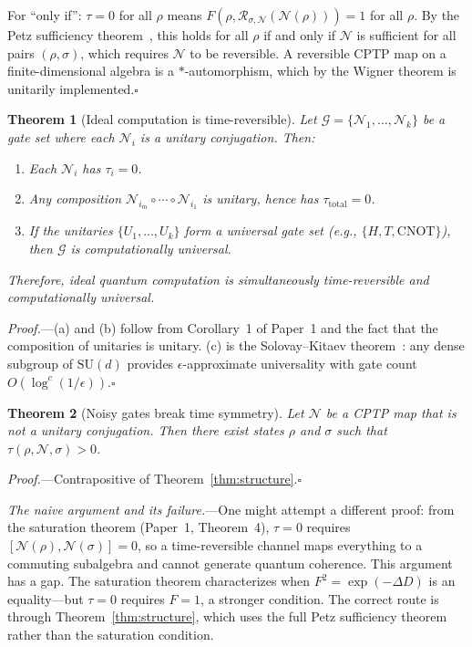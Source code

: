 \documentclass[prl,twocolumn,superscriptaddress,longbibliography,floatfix]{revtex4-2}
\newtheorem{theorem}{Theorem}
\newcommand{\Petz}{\mathcal{R}}
\newcommand{\chan}{\mathcal{N}}
\newcommand{\tauasym}{\tau}
\begin{document}
For ``only if'': $\tauasym = 0$ for all $\rho$ means
$F(\rho, \Petz_{\sigma,\chan}(\chan(\rho))) = 1$ for all $\rho$.  By
the Petz sufficiency theorem~\cite{Petz1988}, this holds for all
$\rho$ if and only if $\chan$ is sufficient for all pairs
$(\rho, \sigma)$, which requires $\chan$ to be reversible.  A
reversible CPTP map on a finite-dimensional algebra is a
$*$-automorphism, which by the Wigner theorem is unitarily
implemented.\hfill$\square$

\begin{theorem}[Ideal computation is time-reversible]
\label{thm:ideal}
Let\/ $\mathcal{G} = \{\chan_1, \ldots, \chan_k\}$ be a gate set
where each $\chan_i$ is a unitary conjugation.  Then:
\begin{enumerate}
\item[\emph{(a)}] Each $\chan_i$ has $\tauasym_i = 0$.
\item[\emph{(b)}] Any composition
  $\chan_{i_m} \circ \cdots \circ \chan_{i_1}$ is unitary, hence has
  $\tauasym_{\mathrm{total}} = 0$.
\item[\emph{(c)}] If the unitaries $\{U_1, \ldots, U_k\}$ form a
  universal gate set (e.g., $\{H, T, \mathrm{CNOT}\}$), then
  $\mathcal{G}$ is computationally universal.
\end{enumerate}
Therefore, ideal quantum computation is simultaneously
time-reversible and computationally universal.
\end{theorem}

\emph{Proof.}---(a) and (b) follow from Corollary~1 of
Paper~1 and the fact that the composition of unitaries is unitary.
(c) is the Solovay--Kitaev theorem~\cite{Kitaev1997,Dawson2006}:
any dense subgroup of $\mathrm{SU}(d)$ provides $\epsilon$-approximate
universality with gate count
$O(\log^c(1/\epsilon))$.\hfill$\square$

\begin{theorem}[Noisy gates break time symmetry]
\label{thm:noisy}
Let $\chan$ be a CPTP map that is not a unitary conjugation.  Then
there exist states $\rho$ and $\sigma$ such that
$\tauasym(\rho, \chan, \sigma) > 0$.
\end{theorem}

\emph{Proof.}---Contrapositive of
Theorem~\ref{thm:structure}.\hfill$\square$

\emph{The naive argument and its failure.}---One might attempt a
different proof: from the saturation theorem (Paper~1, Theorem~4),
$\tauasym = 0$ requires $[\chan(\rho), \chan(\sigma)] = 0$, so a
time-reversible channel maps everything to a commuting subalgebra
and cannot generate quantum coherence.  This argument has a gap.
The saturation theorem characterizes when $F^2 = \exp(-\Delta D)$
is an equality---but $\tauasym = 0$ requires $F = 1$, a stronger
condition.  The correct route is through Theorem~\ref{thm:structure},
which uses the full Petz sufficiency theorem rather than the
saturation condition.
\end{document}
